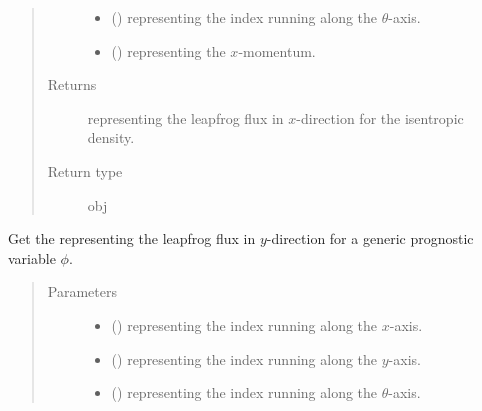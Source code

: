 \documentclass[letterpaper,10pt,english]{sphinxmanual}
\begin{document}
\begin{fulllineitems}
\begin{fulllineitems}
\begin{quote}
\begin{description}
\begin{itemize}
\item {} 
 () \textendash{}  representing the index running along the \(\theta\)-axis.

\item {} 
 () \textendash{}  representing the \(x\)-momentum.

\end{itemize}

\item[{Returns}] \leavevmode
{} representing the leapfrog flux in \(x\)-direction for the isentropic density.

\item[{Return type}] \leavevmode
obj

\end{description}\end{quote}

\end{fulllineitems}


\begin{fulllineitems}
\label{\detokenize{api:dycore.flux_isentropic.FluxIsentropicLeapfrog._get_leapfrog_flux_y}}
Get the  representing the leapfrog flux in \(y\)-direction for a generic
prognostic variable \(\phi\).
\begin{quote}\begin{description}
\item[{Parameters}] \leavevmode\begin{itemize}
\item {} 
 () \textendash{}  representing the index running along the \(x\)-axis.

\item {} 
 () \textendash{}  representing the index running along the \(y\)-axis.

\item {} 
 () \textendash{}  representing the index running along the \(\theta\)-axis.


\end{itemize}
\end{description}
\end{quote}
\end{fulllineitems}
\end{fulllineitems}
\end{document}
